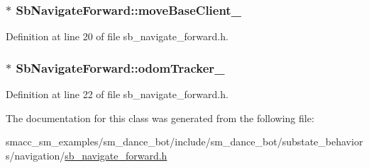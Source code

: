 \subsubsection[{\texorpdfstring{move\+Base\+Client\+\_\+}{moveBaseClient_}}]{$\ast$ Sb\+Navigate\+Forward\+::move\+Base\+Client\+\_\+}\hypertarget{classSbNavigateForward_a6c3b305bdf4a637dad4d80b456575a36}{}\label{classSbNavigateForward_a6c3b305bdf4a637dad4d80b456575a36}


Definition at line 20 of file sb\+\_\+navigate\+\_\+forward.\+h.

\subsubsection[{\texorpdfstring{odom\+Tracker\+\_\+}{odomTracker_}}]{$\ast$ Sb\+Navigate\+Forward\+::odom\+Tracker\+\_\+}\hypertarget{classSbNavigateForward_ac45353a2cfde3c3d2c802065ed1419fc}{}\label{classSbNavigateForward_ac45353a2cfde3c3d2c802065ed1419fc}


Definition at line 22 of file sb\+\_\+navigate\+\_\+forward.\+h.



The documentation for this class was generated from the following file\+:\begin{DoxyCompactItemize}
\item 
smacc\+\_\+sm\+\_\+examples/sm\+\_\+dance\+\_\+bot/include/sm\+\_\+dance\+\_\+bot/substate\+\_\+behaviors/navigation/\hyperlink{sb__navigate__forward_8h}{sb\+\_\+navigate\+\_\+forward.\+h}\end{DoxyCompactItemize}
